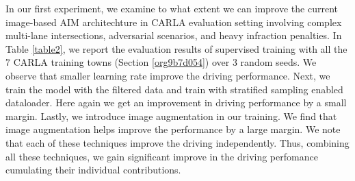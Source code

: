 \documentclass[letterpaper, 12pt]{book}
\theoremstyle{definition}
\theoremstyle{definition}
\theoremstyle{definition}
\theoremstyle{definition}
\theoremstyle{definition}
\begin{document}
In our first experiment, we examine to what extent we can improve the current
image-based AIM architechture \cite{Prakash2021} in CARLA evaluation setting
involving complex multi-lane intersections, adversarial scenarios, and heavy
infraction penalties. In Table \ref{table2}, we report the evaluation results of
supervised training with all the 7 CARLA training towns (Section \ref{org9b7d054}) over 3
random seeds. We observe that smaller learning rate improve the driving
performance. Next, we train the model with the filtered data and train with
stratified sampling enabled dataloader. Here again we get an improvement in
driving performance by a small margin. Lastly, we introduce image augmentation
in our training. We find that image augmentation helps improve the performance
by a large margin. We note that each of these techniques improve the driving
independently. Thus, combining all these techniques, we gain significant improve
in the driving perfomance cumulating their individual contributions.
\end{document}
